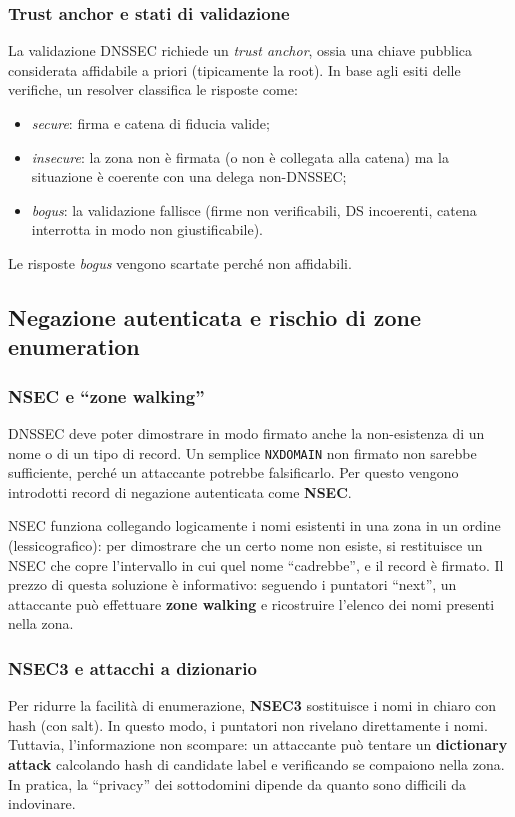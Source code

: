 \subsubsection{Trust anchor e stati di validazione}
La validazione DNSSEC richiede un \emph{trust anchor}, ossia una chiave pubblica considerata affidabile a priori (tipicamente la root). In base agli esiti delle verifiche, un resolver classifica le risposte come:
\begin{itemize}
    \item \emph{secure}: firma e catena di fiducia valide;
    \item \emph{insecure}: la zona non è firmata (o non è collegata alla catena) ma la situazione è coerente con una delega non-DNSSEC;
    \item \emph{bogus}: la validazione fallisce (firme non verificabili, DS incoerenti, catena interrotta in modo non giustificabile).
\end{itemize}
Le risposte \emph{bogus} vengono scartate perché non affidabili.

\subsection{Negazione autenticata e rischio di zone enumeration}

\subsubsection{NSEC e “zone walking”}
DNSSEC deve poter dimostrare in modo firmato anche la non-esistenza di un nome o di un tipo di record. Un semplice \texttt{NXDOMAIN} non firmato non sarebbe sufficiente, perché un attaccante potrebbe falsificarlo. Per questo vengono introdotti record di negazione autenticata come \textbf{NSEC}.

NSEC funziona collegando logicamente i nomi esistenti in una zona in un ordine (lessicografico): per dimostrare che un certo nome non esiste, si restituisce un NSEC che copre l’intervallo in cui quel nome “cadrebbe”, e il record è firmato. Il prezzo di questa soluzione è informativo: seguendo i puntatori “next”, un attaccante può effettuare \textbf{zone walking} e ricostruire l’elenco dei nomi presenti nella zona.

\subsubsection{NSEC3 e attacchi a dizionario}
Per ridurre la facilità di enumerazione, \textbf{NSEC3} sostituisce i nomi in chiaro con hash (con salt). In questo modo, i puntatori non rivelano direttamente i nomi. Tuttavia, l’informazione non scompare: un attaccante può tentare un \textbf{dictionary attack} calcolando hash di candidate label e verificando se compaiono nella zona. In pratica, la “privacy” dei sottodomini dipende da quanto sono difficili da indovinare.

